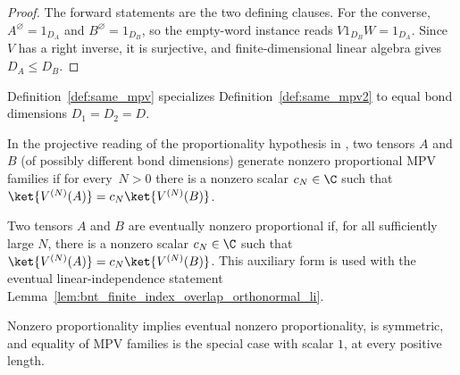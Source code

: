 \begin{proof}
    \leanok
    The forward statements are the two defining clauses.  For the converse,
    $A^{\varnothing}=1_{D_A}$ and $B^{\varnothing}=1_{D_B}$, so the empty-word
    instance reads $V1_{D_B}W=1_{D_A}$.  Since $V$ has a right inverse, it is
    surjective, and finite-dimensional linear algebra gives $D_A\leq D_B$.
\end{proof}

\begin{remark}\leanok
    Definition~\ref{def:same_mpv} specializes Definition~\ref{def:same_mpv2}
    to equal bond dimensions $D_1=D_2=D$.
\end{remark}

\begin{definition}\label{def:nonzero_proportional_mpv}
    \leanok
    In the projective reading of the proportionality hypothesis in
    \cite[Theorem~2.10]{Cirac2016MPDO_arXiv}, two tensors $A$ and $B$ (of
    possibly different bond dimensions) generate nonzero proportional MPV
    families if for every~$N>0$ there is a nonzero scalar $c_N \in \C$ such
    that $\ket{V^{(N)}(A)} = c_N \ket{V^{(N)}(B)}$.
\end{definition}

\begin{definition}%
    \label{def:eventually_nonzero_proportional_mpv}
    \leanok
    Two tensors $A$ and $B$ are eventually nonzero proportional if, for all
    sufficiently large $N$, there is a nonzero scalar $c_N \in \C$ such that
    $\ket{V^{(N)}(A)} = c_N \ket{V^{(N)}(B)}$. This auxiliary form is used with
    the eventual linear-independence statement
    Lemma~\ref{lem:bnt_finite_index_overlap_orthonormal_li}.
\end{definition}

\begin{lemma}%
    \label{lem:nonzero_proportional_mpv_basic}
    \leanok
    Nonzero proportionality implies eventual nonzero
    proportionality, is symmetric, and equality of MPV families is the special
    case with scalar $1$, at every positive length.
\end{lemma}

